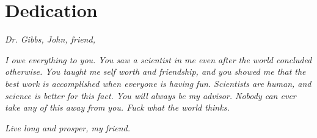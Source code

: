 \chapter*{Dedication}

\vspace{5em}

\textit{Dr. Gibbs, John, friend,}
\vspace{1em}

\textit{I owe everything to you. You saw a scientist in me even after the world concluded otherwise. You taught me self worth and friendship, and you showed me that the best work is accomplished when everyone is having fun. Scientists are human, and science is better for this fact. You will always be my advisor. Nobody can ever take any of this away from you. Fuck what the world thinks.}
\vspace{1em}

\textit{Live long and prosper, my friend.}
